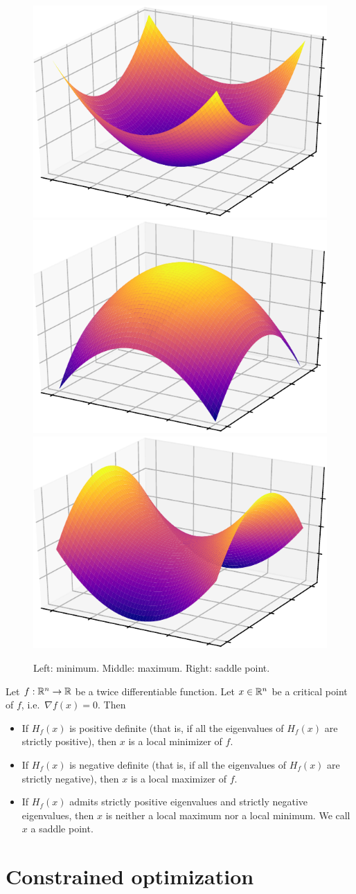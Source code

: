 \documentclass[11pt,nocut]{article}
\begin{document}
\begin{figure}[h!]
	\begin{center}
		\includegraphics[width=0.3\linewidth]{figures/min-crop.pdf}
		\includegraphics[width=0.3\linewidth]{figures/max-crop.pdf}
		\includegraphics[width=0.3\linewidth]{figures/saddle-crop.pdf}
	\end{center}
	\caption{Left: minimum. Middle: maximum. Right: saddle point.}
\end{figure}
\begin{proposition}
	Let $f:\mathbb{R}^n \to \mathbb{R}$ be a twice differentiable function. Let $x \in \mathbb{R}^n$ be a critical point of $f$, i.e.\ $\nabla f(x) = 0$. Then
	\begin{itemize}
		\item If $H_f(x)$ is positive definite (that is, if all the eigenvalues of $H_f(x)$ are strictly positive), then $x$ is a local minimizer of $f$.
		\item If $H_f(x)$ is negative definite (that is, if all the eigenvalues of $H_f(x)$ are strictly negative), then $x$ is a local maximizer of $f$.
		\item If $H_f(x)$ admits strictly positive eigenvalues and strictly negative eigenvalues, then $x$ is neither a local maximum nor a local minimum. We call $x$ a saddle point.
	\end{itemize}
\end{proposition}

\section{Constrained optimization}
\end{document}
